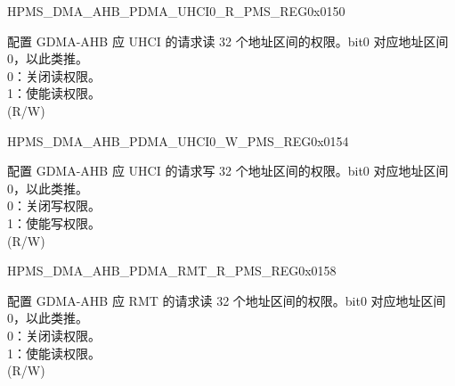 \begin{register}{H}{PMS\_DMA\_AHB\_PDMA\_UHCI0\_R\_PMS\_REG}{0x0150}\label{regdesc:PMSDMAAHBPDMAUHCI0RPMSREG}
%
\regnewline%
\begin{regdesc}\begin{reglist}
\label{fielddesc:PMSDMAAHBPDMAUHCI0RPMS}\item [PMS\_DMA\_AHB\_PDMA\_UHCI0\_R\_PMS] 配置 GDMA-AHB 应 UHCI 的请求读 32 个地址区间的权限。bit0 对应地址区间 0，以此类推。\\
0：关闭读权限。\\
1：使能读权限。\\ (R/W)
\end{reglist}\end{regdesc}
\end{register}


\begin{register}{H}{PMS\_DMA\_AHB\_PDMA\_UHCI0\_W\_PMS\_REG}{0x0154}\label{regdesc:PMSDMAAHBPDMAUHCI0WPMSREG}
%
\regnewline%
\begin{regdesc}\begin{reglist}
\label{fielddesc:PMSDMAAHBPDMAUHCI0WPMS}\item [PMS\_DMA\_AHB\_PDMA\_UHCI0\_W\_PMS] 配置 GDMA-AHB 应 UHCI 的请求写 32 个地址区间的权限。bit0 对应地址区间 0，以此类推。\\
0：关闭写权限。\\
1：使能写权限。\\ (R/W)
\end{reglist}\end{regdesc}
\end{register}


\begin{register}{H}{PMS\_DMA\_AHB\_PDMA\_RMT\_R\_PMS\_REG}{0x0158}\label{regdesc:PMSDMAAHBPDMARMTRPMSREG}
%
\regnewline%
\begin{regdesc}\begin{reglist}
\label{fielddesc:PMSDMAAHBPDMARMTRPMS}\item [PMS\_DMA\_AHB\_PDMA\_RMT\_R\_PMS] 配置 GDMA-AHB 应 RMT 的请求读 32 个地址区间的权限。bit0 对应地址区间 0，以此类推。\\
0：关闭读权限。\\
1：使能读权限。\\ (R/W)
\end{reglist}\end{regdesc}
\end{register}



